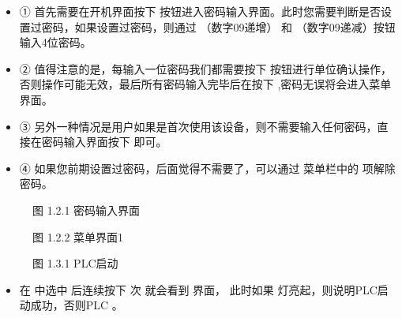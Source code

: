 \documentclass[a4paper,10pt,english]{sphinxmanual}
\begin{document}
\sphinxAtStartPar
{}
\begin{itemize}
\item {} 
\sphinxAtStartPar
① 首先需要在开机界面按下  按钮进入密码输入界面。此时您需要判断是否设置过密码，如果设置过密码，则通过  （数字0\sphinxhyphen{}9递增） 和  （数字0\sphinxhyphen{}9递减）按钮输入4位密码。

\item {} 
\sphinxAtStartPar
② 值得注意的是，每输入一位密码我们都需要按下  按钮进行单位确认操作，否则操作可能无效，最后所有密码输入完毕后在按下  ,密码无误将会进入菜单界面。

\item {} 
\sphinxAtStartPar
③ 另外一种情况是用户如果是首次使用该设备，则不需要输入任何密码，直接在密码输入界面按下  即可。

\item {} 
\sphinxAtStartPar
④ 如果您前期设置过密码，后面觉得不需要了，可以通过 菜单栏中的  项解除密码。

\end{itemize}

\begin{figure}[htbp]
\centering
\capstart

\noindent{}
\caption{图 1.2.1 密码输入界面}\label{\detokenize{operation_guide:id4}}\end{figure}

\begin{figure}[htbp]
\centering
\capstart

\noindent{}
\caption{图 1.2.2 菜单界面1}\label{\detokenize{operation_guide:id5}}\end{figure}

\sphinxAtStartPar
{}

\begin{figure}[htbp]
\centering
\capstart

\noindent{}
\caption{图 1.3.1 PLC启动}\label{\detokenize{operation_guide:id6}}\end{figure}
\begin{itemize}
\item {} 
\sphinxAtStartPar
在  中选中  后连续按下  次  就会看到  界面，
此时如果  灯亮起，则说明PLC启动成功，否则PLC 。

\end{itemize}
\end{document}
